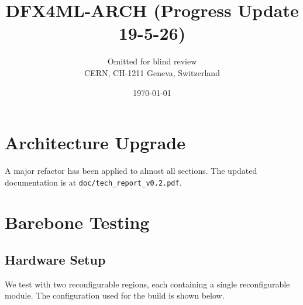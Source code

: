 \documentclass{cernatsnote}
\title{DFX4ML-ARCH (Progress Update 19-5-26)}
\author{
	Omitted for blind review \\
	CERN, CH-1211 Geneva, Switzerland
}
\date{\today}
\begin{document}
\maketitle
 
\begin{abstract}
\end{abstract}

\tableofcontents

\pagebreak

\section{Architecture Upgrade}

A major refactor has been applied to almost all sections. The updated documentation is at \texttt{doc/tech\_report\_v0.2.pdf}.

\section{Barebone Testing}

\subsection{Hardware Setup}

We test with two reconfigurable regions, each containing a single reconfigurable module. The configuration used for the build is shown below.
\end{document}
